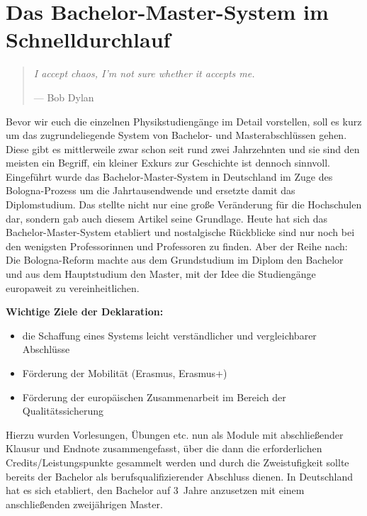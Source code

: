 \section{Das Bachelor-Master-System im Schnelldurchlauf}

\begin{multicols}{2}
\begin{quote}
	\textit{\foreignlanguage{english}{I accept chaos, I'm not sure whether it accepts me.}}

	\hfill--- Bob Dylan
\end{quote}
Bevor wir euch die einzelnen Physikstudiengänge im Detail vorstellen, soll es kurz um das zugrundeliegende System von Bachelor- und Masterabschlüssen gehen.
Diese gibt es mittlerweile zwar schon seit rund zwei Jahrzehnten und sie sind den meisten ein Begriff, ein kleiner Exkurs zur Geschichte ist dennoch sinnvoll.
Eingeführt wurde das Bachelor-Master-System in Deutschland im Zuge des Bologna-Prozess um die Jahrtausendwende und ersetzte damit das Diplomstudium.
Das stellte nicht nur eine große Veränderung für die Hochschulen dar, sondern gab auch diesem Artikel seine Grundlage.
Heute hat sich das Bachelor-Master-System etabliert und nostalgische Rückblicke sind nur noch bei den wenigsten Professorinnen und Professoren zu finden.
Aber der Reihe nach: Die Bologna-Reform machte aus dem Grundstudium im Diplom den Bachelor und aus dem Hauptstudium den Master, mit der Idee die Studiengänge europaweit zu vereinheitlichen.

\textbf{Wichtige Ziele der Deklaration:}
\begin{itemize}
	\item die Schaffung eines Systems leicht verständlicher und vergleichbarer Abschlüsse
	\item Förderung der Mobilität (Erasmus, Erasmus+)
	\item Förderung der europäischen Zusammenarbeit im Bereich der Qualitätssicherung
\end{itemize}

Hierzu wurden Vorlesungen, Übungen etc. nun als Module mit abschließender Klausur und Endnote zusammengefasst, über die dann die erforderlichen Credits/Leistungspunkte gesammelt werden und durch die Zweistufigkeit sollte bereits der Bachelor als berufsqualifizierender Abschluss dienen.
In Deutschland hat es sich etabliert, den Bachelor auf 3~Jahre anzusetzen mit einem anschließenden zweijährigen Master.


\end{multicols}
